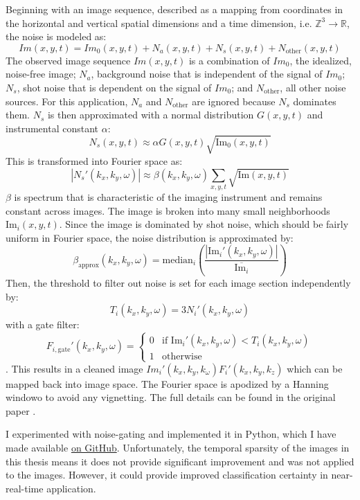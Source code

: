 \documentclass[twoside]{report}
\begin{document}
Beginning with an image sequence, described as a mapping from coordinates in the horizontal and vertical spatial dimensions and a time dimension, i.e. $\mathbb{Z}^3 \rightarrow \mathbb{R}$, the noise is modeled as:
\[Im(x,y,t) = Im_0(x,y,t) + N_a(x,y,t) + N_s(x,y,t) + N_{\text{other}}(x,y,t) \]
The observed image sequence $Im(x,y,t)$ is a combination of $Im_0$, the idealized, noise-free image; $N_a$, background noise that is independent of the signal of $Im_0$; $N_s$, shot noise that is dependent on the signal of $Im_0$; and $N_{\text{other}}$, all other noise sources. For this application, $N_a$ and $N_{\text{other}}$ are ignored because $N_s$ dominates them.  $N_s$ is then approximated with a normal distribution $G(x,y,t)$ and instrumental constant $\alpha$:
\[N_s(x,y,t) \approx \alpha G(x,y,t) \sqrt{\text{Im}_0(x,y,t)} \]
This is transformed into Fourier space as:
\[|N_s'(k_x, k_y, \omega)| \approx \beta(k_x, k_y, \omega) \sum_{x,y,t}\sqrt{\text{Im}(x,y,t)}\]
$\beta$ is spectrum that is characteristic of the imaging instrument and remains constant across images. The image is broken into many small neighborhoods $\text{Im}_i (x,y,t)$. Since the image is dominated by shot noise, which should be fairly uniform in Fourier space, the noise distribution is approximated by: \[\beta_{\text{approx}}(k_x,k_y,\omega) = \text{median}_i \left(\frac{|\text{Im}_i'(k_x,k_y,\omega)|}{\overline{\text{Im}_i}} \right)\] Then, the threshold to filter out noise is set for each image section independently by:
\[T_i(k_x, k_y, \omega) = 3 N_i'(k_x, k_y, \omega)\] with a gate filter:
\[F_{i, \text{gate}}' (k_x, k_y, \omega) = \begin{cases} 0 & \text{if Im}_i'(k_x, k_y, \omega) < T_i(k_x, k_y, \omega) \\ 1 & \text{otherwise} \end{cases}\]. 
This results in a cleaned image $Im_i'(k_x, k_y, k_\omega) F_i'(k_x, k_y, k_z)$ which can be mapped back into image space. The Fourier space is apodized by a Hanning windowo to avoid any vignetting. The full details can be found in the original paper \cite{deforest:2017}. 

I experimented with noise-gating and implemented it in Python, which I have made available \href{https://github.com/jmbhughes/noise_gating}{on GitHub}. Unfortunately, the temporal sparsity of the images in this thesis means it does not provide significant improvement and was not applied to the images. However, it could provide improved classification certainty in near-real-time application. 
\end{document}
